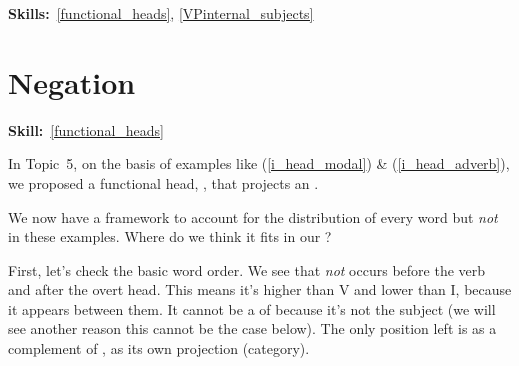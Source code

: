 \documentclass{article}
\begin{document}
\maketitle
\subtitle{Topic 6 Course Notes: X-bar and the Clause Part 2\\
Other Functional Categories}
\hfill{}\textbf{Skills:}~\ref{functional_heads},
\ref{VPinternal_subjects}

\section{Negation}
\hfill{}\textbf{Skill:}~\ref{functional_heads}

In Topic~5, on the basis of examples like (\ref{i_head_modal}) \& (\ref{i_head_adverb}), we proposed a functional head, , that projects an .
\begin{exe}
    \label{i_head_modal}
    \label{i_head_adverb}
\end{exe}
We now have a framework to account for the distribution of every word but \emph{not} in these examples. Where do we think it fits in our ?

First, let's check the basic word order. We see that \emph{not} occurs before the verb and after the overt  head. This means it's higher than V and lower than I, because it appears between them. It cannot be a  of  because it's not the subject (we will see another reason this cannot be the case below). The only position left is as a complement of , as its own projection (category).
\end{document}
